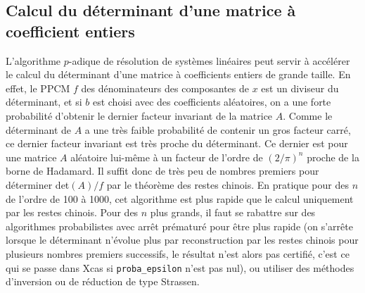 \documentclass[a4paper,11pt]{book}
\begin{document}
\begin{giacjshere}
\subsection{Calcul du d\'eterminant d'une matrice \`a coefficient entiers}
L'algorithme $p$-adique de r\'esolution de syst\`emes
lin\'eaires peut servir \`a acc\'el\'erer le calcul du
d\'eterminant d'une matrice \`a coefficients entiers de grande taille.
En effet, le PPCM $f$ des d\'enominateurs des composantes de $x$ est
un diviseur du d\'eterminant, et si $b$ est choisi avec des
coefficients al\'eatoires, on a une forte probabilit\'e d'obtenir
le dernier facteur invariant de la matrice $A$. Comme le d\'eterminant
de $A$ a une tr\`es faible probabilit\'e de contenir un gros facteur
carr\'e, ce dernier facteur invariant est tr\`es proche du
d\'eterminant. Ce dernier est pour une matrice $A$ al\'eatoire
lui-m\^eme \`a un facteur de l'ordre de $(2/\pi)^n$ proche
de la borne de Hadamard. Il suffit donc de tr\`es peu de nombres
premiers pour d\'eterminer det$(A)/f$ par le th\'eor\`eme
des restes chinois. En pratique pour des $n$ de l'ordre de 100
\`a 1000, cet algorithme est plus rapide que le calcul uniquement
par les restes chinois. Pour des $n$ plus grands, il faut se
rabattre sur des algorithmes probabilistes avec arr\^et pr\'ematur\'e
pour \^etre plus rapide (on s'arr\^ete lorsque le d\'eterminant
n'\'evolue plus par reconstruction par les restes chinois 
pour plusieurs nombres premiers successifs, le r\'esultat n'est
alors pas certifi\'e, c'est ce qui se passe dans Xcas si
\verb|proba_epsilon| n'est pas nul), 
ou utiliser des m\'ethodes
d'inversion ou de r\'eduction de type Strassen.


\end{giacjshere}
\end{document}
